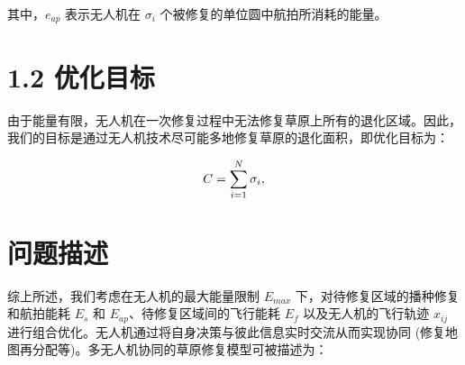 \documentclass[AutoFakeBold]{LZUThesis}
\begin{document}
其中，$e_{ap}$ 表示无人机在 $\sigma_i$ 个被修复的单位圆中航拍所消耗的能量。

\section{1.2 优化目标}

由于能量有限，无人机在一次修复过程中无法修复草原上所有的退化区域。因此，我们的目标是通过无人机技术尽可能多地修复草原的退化面积，即优化目标为：

\begin{equation} \label{maximize-the-sum}
	\begin{small}
		C = \sum^N_{i=1}\sigma_i,
	\end{small}
\end{equation}

\section{问题描述}

综上所述，我们考虑在无人机的最大能量限制 $E_{max}$ 下，对待修复区域的播种修复和航拍能耗 $E_s$ 和 $E_{ap}$、待修复区域间的飞行能耗 $E_f$ 以及无人机的飞行轨迹 $x_{ij}$ 进行组合优化。无人机通过将自身决策与彼此信息实时交流从而实现协同 (修复地图再分配等)。多无人机协同的草原修复模型可被描述为：
\end{document}
